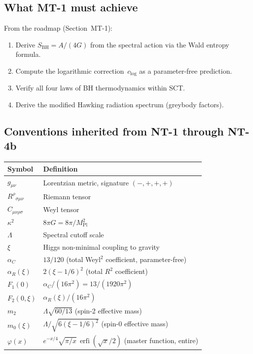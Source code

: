 \documentclass[12pt,a4paper]{article}
\theoremstyle{definition}
\theoremstyle{remark}
\newcommand{\erfi}{\operatorname{erfi}}
\begin{document}
\subsection{What MT-1 must achieve}

From the roadmap (Section~MT-1):
\begin{enumerate}[nosep]
  \item Derive $S_{\mathrm{BH}} = A/(4G)$ from the spectral action
    via the Wald entropy formula.
  \item Compute the logarithmic correction~$c_{\log}$ as a
    parameter-free prediction.
  \item Verify all four laws of BH thermodynamics within SCT.
  \item Derive the modified Hawking radiation spectrum (greybody factors).
\end{enumerate}

\subsection{Conventions inherited from NT-1 through NT-4b}

\begin{center}
\begin{tabular}{ll}
\toprule
Symbol & Definition \\
\midrule
$g_{\mu\nu}$ & Lorentzian metric, signature $(-,+,+,+)$ \\
$R^{\rho}{}_{\sigma\mu\nu}$ & Riemann tensor \\
$C_{\mu\nu\rho\sigma}$ & Weyl tensor \\
$\kappa^2$ & $8\pi G = 8\pi / M_{\mathrm{Pl}}^2$ \\
$\Lambda$ & Spectral cutoff scale \\
$\xi$ & Higgs non-minimal coupling to gravity \\
$\alpha_C$ & $13/120$ (total Weyl${}^2$ coefficient, parameter-free) \\
$\alpha_R(\xi)$ & $2(\xi - 1/6)^2$ (total $R^2$ coefficient) \\
$F_1(0)$ & $\alpha_C/(16\pi^2) = 13/(1920\pi^2)$ \\
$F_2(0,\xi)$ & $\alpha_R(\xi)/(16\pi^2)$ \\
$m_2$ & $\Lambda\sqrt{60/13}$ (spin-2 effective mass) \\
$m_0(\xi)$ & $\Lambda/\sqrt{6(\xi - 1/6)^2}$ (spin-0 effective mass) \\
$\varphi(x)$ & $e^{-x/4}\sqrt{\pi/x}\,\erfi(\sqrt{x}/2)$
  (master function, entire) \\
\bottomrule
\end{tabular}
\end{center}
\end{document}
